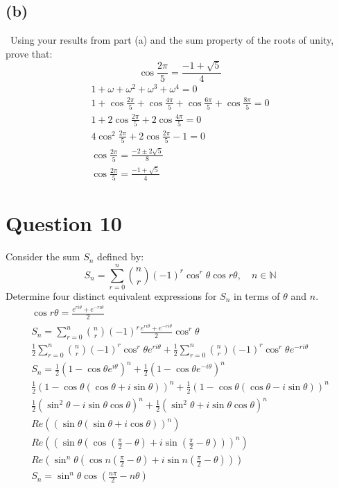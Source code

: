 \documentclass[12pt]{article}
\begin{document}
\subsection{(b)} \, Using your results from part (a) and the sum property of the roots of unity, prove that:
\[
\cos \frac{2\pi}{5}=\frac{-1+\sqrt{5}}{4}
\]
\begin{gather*}
    1+\omega + \omega^2+\omega^3+\omega^4=0\\
    1+\cos \frac{2\pi}{5}+\cos \frac{4\pi}{5}+\cos \frac{6\pi}{5}+\cos \frac{8\pi}{5}=0\\
    1+2\cos \frac{2\pi}{5}+2\cos \frac{4\pi}{5}=0\\
    4\cos^2 \frac{2\pi}{5}+2\cos \frac{2\pi}{5}-1=0\\
    \cos \frac{2\pi}{5}=\frac{-2\pm2\sqrt{5}}{8} \\
    \boxed{\cos \frac{2\pi}{5}=\frac{-1+\sqrt{5}}{4}}
\end{gather*}

\section{Question 10}
Consider the sum $S_n$ defined by:
\[
S_n=\sum_{r=0}^n \binom{n}{r}(-1)^r \cos ^r \theta \cos  r\theta, \quad n\in \mathbb{N}
\]
Determine four distinct equivalent expressions for $S_n$ in terms of $\theta$ and $n$.
\begin{gather*}
    \cos r\theta = \frac{e^{ri\theta}+e^{-ri\theta}}{2}\\
    S_n=\sum_{r=0}^n \binom{n}{r}(-1)^r \frac{e^{ri\theta}+e^{-ri\theta}}{2}\cos ^r \theta \\
    \frac{1}{2}\sum_{r=0}^n\binom{n}{r}(-1)^r\cos ^r \theta e^{ri\theta}+\frac{1}{2}\sum_{r=0}^n\binom{n}{r}(-1)^r\cos ^r \theta e^{-ri\theta}\\
    {S_n=\frac{1}{2}(1-\cos \theta e^{i\theta})^n+\frac{1}{2}(1-\cos \theta e^{-i\theta})^n}\\
    \frac{1}{2}(1-\cos \theta (\cos \theta + i \sin \theta))^n+\frac{1}{2}(1-\cos \theta (\cos \theta - i \sin \theta))^n\\
    \frac{1}{2}(\sin^2 \theta  - i \sin \theta \cos \theta)^n+\frac{1}{2}(\sin^2 \theta + i \sin \theta \cos \theta)^n\\
    Re((\sin\theta (\sin\theta+i\cos\theta))^n)\\
    Re((\sin\theta (\cos(\frac{\pi}{2}-\theta)+i\sin(\frac{\pi}{2}-\theta)))^n)\\
    Re(\sin^n\theta(\cos n(\frac{\pi}{2}-\theta)+i\sin n(\frac{\pi}{2}-\theta)))\\
    \boxed{S_n=\sin^n\theta \cos (\frac{n\pi}{2}-n\theta)}
\end{gather*}
\end{document}
